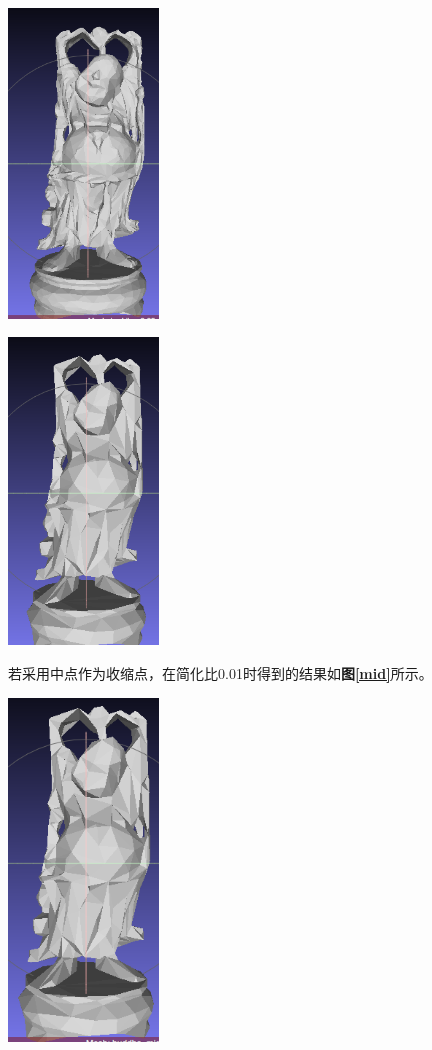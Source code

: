 \documentclass[11pt, a4paper]{article}
\makeatletter
\newcommand\fcaption{\def\@captype{figure}\caption}
\newcommand{\fref}[1]{\textbf{图\ref{#1}}}
\makeatother
\begin{document}
\begin{center}
    \includegraphics[width=4cm]{../output/buddha0.05.png}
    \fcaption{简化比0.05}\label{s2}
\end{center}

\begin{center}
    \includegraphics[width=4cm]{../output/buddha0.01.png}
    \fcaption{简化比0.01}\label{s3}
\end{center}

若采用中点作为收缩点，在简化比0.01时得到的结果如\fref{mid}所示。

\begin{center}
    \includegraphics[width=4cm]{../output/buddham.png}
    \fcaption{利用中点作为收缩点，简化比0.01}\label{mid}
\end{center}
\end{document}
